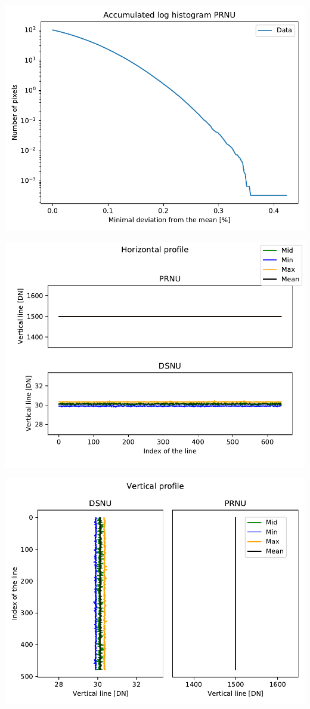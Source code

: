 \documentclass[a4paper,twoside,12pt,american,hidelinks]{article}
\begin{document}
\begin{center}
\includegraphics[height=0.45\textheight,keepaspectratio]{OP1/PlotAccumulatedLogHistogramPRNU.pdf}
\end{center}
\vfill
\newpage
\begin{center}
\includegraphics[height=0.45\textheight,keepaspectratio]{OP1/PlotHorizontalProfile.pdf}
\end{center}
\begin{center}
\includegraphics[height=0.45\textheight,keepaspectratio]{OP1/PlotVerticalProfile.pdf}
\end{center}
\vfill
\end{document}
